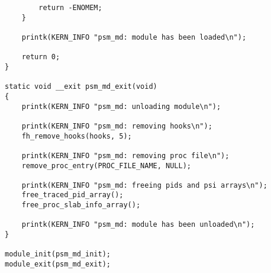 \begin{lstlisting}
		return -ENOMEM;
	}
	
	printk(KERN_INFO "psm_md: module has been loaded\n");
	
	return 0;
}

static void __exit psm_md_exit(void)
{
	printk(KERN_INFO "psm_md: unloading module\n");
	
	printk(KERN_INFO "psm_md: removing hooks\n");
	fh_remove_hooks(hooks, 5);
	
	printk(KERN_INFO "psm_md: removing proc file\n");
	remove_proc_entry(PROC_FILE_NAME, NULL);
	
	printk(KERN_INFO "psm_md: freeing pids and psi arrays\n");
	free_traced_pid_array();
	free_proc_slab_info_array();
	
	printk(KERN_INFO "psm_md: module has been unloaded\n");
}

module_init(psm_md_init);
module_exit(psm_md_exit);
\end{lstlisting}

\clearpage

